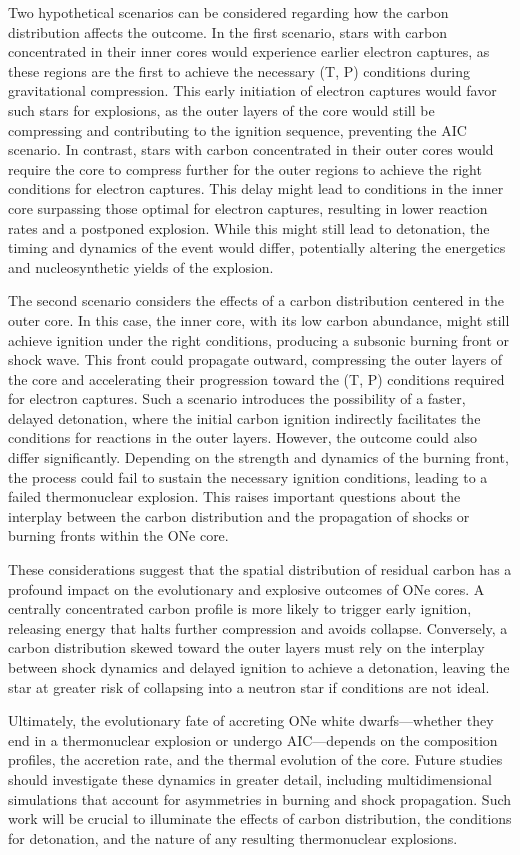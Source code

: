 \documentclass[main.tex]{subfiles}
\begin{document}
    Two hypothetical scenarios can be considered regarding how the carbon distribution affects the outcome. In the first scenario, stars with carbon concentrated in their inner cores would experience earlier electron captures, as these regions are the first to achieve the necessary (T, P) conditions during gravitational compression. This early initiation of electron captures would favor such stars for explosions, as the outer layers of the core would still be compressing and contributing to the ignition sequence, preventing the AIC scenario. In contrast, stars with carbon concentrated in their outer cores would require the core to compress further for the outer regions to achieve the right conditions for electron captures. This delay might lead to conditions in the inner core surpassing those optimal for  electron captures, resulting in lower reaction rates and a postponed explosion. While this might still lead to detonation, the timing and dynamics of the event would differ, potentially altering the energetics and nucleosynthetic yields of the explosion.
    
    The second scenario considers the effects of a carbon distribution centered in the outer core. In this case, the inner core, with its low carbon abundance, might still achieve ignition under the right conditions, producing a subsonic burning front or shock wave. This front could propagate outward, compressing the outer layers of the core and accelerating their progression toward the (T, P) conditions required for electron captures. Such a scenario introduces the possibility of a faster, delayed detonation, where the initial carbon ignition indirectly facilitates the conditions for  reactions in the outer layers. However, the outcome could also differ significantly. Depending on the strength and dynamics of the burning front, the process could fail to sustain the necessary ignition conditions, leading to a failed thermonuclear explosion. This raises important questions about the interplay between the carbon distribution and the propagation of shocks or burning fronts within the ONe core.
    
    These considerations suggest that the spatial distribution of residual carbon has a profound impact on the evolutionary and explosive outcomes of ONe cores. 
    A centrally concentrated carbon profile is more likely to trigger early ignition, releasing energy that halts further compression and avoids collapse. Conversely, a carbon distribution skewed toward the outer layers must rely on the interplay between shock dynamics and delayed ignition to achieve a detonation, leaving the star at greater risk of collapsing into a neutron star if conditions are not ideal.
    
    Ultimately, the evolutionary fate of accreting ONe white dwarfs---whether they end in a thermonuclear explosion or undergo AIC---depends on the composition profiles, the accretion rate, and the thermal evolution of the core. 
    Future studies should investigate these dynamics in greater detail, including multidimensional simulations that account for asymmetries in burning and shock propagation. Such work will be crucial to illuminate the effects of carbon distribution, the conditions for detonation, and the nature of any resulting thermonuclear explosions.
\end{document}
